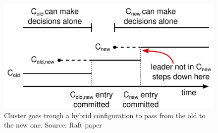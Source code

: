 \begin{figure}[h]
  \centering
  \includegraphics[width=.6\linewidth]{images/raftMembershipChange.png}
  \caption{Cluster goes trough a hybrid configuration to pass from the old to the new one. Source: Raft paper \cite{raft}}
  \label{fig:configRaft}
\end{figure}
